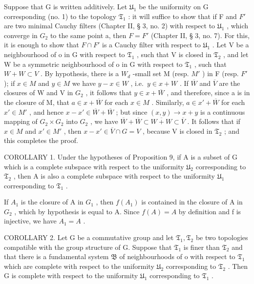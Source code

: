 Suppose that G is written additively. Let \(\mathfrak{U}_{1}\) be the uniformity on G corresponding (no. 1) to the topology \(\mathfrak{T}_{1}\) : it will suffice to show that if F and \(F'\) are two minimal Cauchy filters (Chapter II, § 3, no. 2) with respect to \(\mathfrak{U}_{1}\) , which converge in \(G_{2}\) to the same point a, then \(F = F'\) (Chapter II, § 3, no. 7). For this, it is enough to show that \(F \cap F'\) is a Cauchy filter with respect to \(\mathfrak{U}_{1}\) . Let V be a neighbourhood of o in G with respect to \(\mathfrak{T}_{1}\) , such that V is closed in \(\mathfrak{T}_{2}\) , and let W be a symmetric neighbourhood of o in G with respect to \(\mathfrak{T}_{1}\) , such that \(W + W \subset V\) . By hypothesis, there is a \(W_{d}\) -small set M (resp. \(M'\) ) in F (resp. \(F'\) ); if \(x \in M\) and \(y \in M\) we have \(y - x \in W\) , i.e.~\(y \in x + W\) . If \(\overline{W}\) and \(\overline{V}\) are the closures of W and V in \(G_{2}\) , it follows that \(y \in x + \overline{W}\) , and therefore, since a is in the closure of M, that \(a \in x + \overline{W}\) for each \(x \in M\) . Similarly, \(a \in x' + \overline{W}\) for each \(x' \in M'\) , and hence \(x - x' \in \overline{W} + \overline{W}\) ; but since \((x, y) \to x + y\) is a continuous mapping of \(G_{2} \times G_{2}\) into \(G_{2}\) , we have \(\overline{W} + \overline{W} \subset \overline{W + W} \subset \overline{V}\) . It follows that if \(x \in M\) and \(x' \in M'\) , then \(x - x' \in \overline{V} \cap G = V\) , because V is closed in \(\mathfrak{T}_{2}\) ; and this completes the proof.

COROLLARY 1. Under the hypotheses of Proposition 9, if A is a subset of G which is a complete subspace with respect to the uniformity \(\mathfrak{U}_{2}\) corresponding to \(\mathfrak{T}_{2}\) , then A is also a complete subspace with respect to the uniformity \(\mathfrak{U}_{1}\) corresponding to \(\mathfrak{T}_{1}\) .

If \(A_{1}\) is the closure of A in \(G_{1}\) , then \(f(A_{1})\) is contained in the closure of A in \(G_{2}\) , which by hypothesis is equal to A. Since \(f(A)=A\) by definition and f is injective, we have \(A_{1}=A\) .

COROLLARY 2. Let G be a commutative group and let \(\mathfrak{T}_1, \mathfrak{T}_2\) be two topologies compatible with the group structure of G. Suppose that \(\mathfrak{T}_1\) is finer than \(\mathfrak{T}_2\) and that there is a fundamental system \(\mathfrak{B}\) of neighbourhoods of o with respect to \(\mathfrak{T}_1\) which are complete with respect to the uniformity \(\mathfrak{U}_2\) corresponding to \(\mathfrak{T}_2\) . Then G is complete with respect to the uniformity \(\mathfrak{U}_1\) corresponding to \(\mathfrak{T}_1\) .

